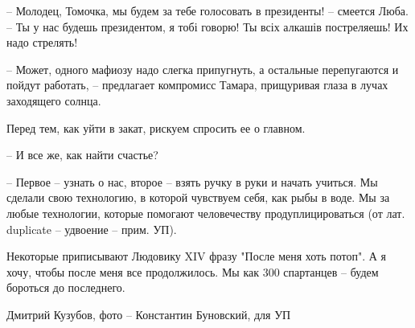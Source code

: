 – Молодец, Томочка, мы будем за тебе голосовать в президенты! – смеется Люба. –
Ты у нас будешь президентом, я тобі говорю! Ты всіх алкашів постреляешь! Их
надо стрелять!

– Может, одного мафиозу надо слегка припугнуть, а остальные перепугаются и
пойдут работать, – предлагает компромисс Тамара, прищуривая глаза в лучах
заходящего солнца.

Перед тем, как уйти в закат, рискуем спросить ее о главном.

– И все же, как найти счастье?

– Первое – узнать о нас, второе – взять ручку в руки и начать учиться. Мы
сделали свою технологию, в которой чувствуем себя, как рыбы в воде. Мы за любые
технологии, которые помогают человечеству продуплицироваться (от лат. duplicate
– удвоение – прим. УП). 

Некоторые приписывают Людовику XIV фразу "После меня хоть потоп". А я хочу,
чтобы после меня все продолжилось. Мы как 300 спартанцев – будем бороться до
последнего.

Дмитрий Кузубов, фото – Константин Буновский, для УП
